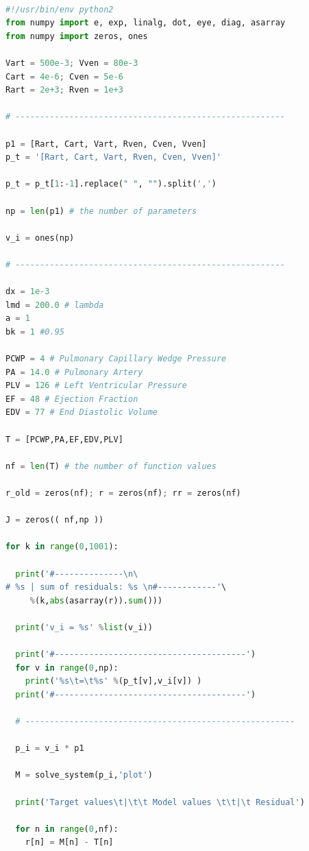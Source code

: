 
\begin{lstlisting}[language=Python,caption={Процедура оптимизации на основе алгоритма Левенберга-Марквардта на языке программирования Python},label={list:optimization_routine}]

#!/usr/bin/env python2
from numpy import e, exp, linalg, dot, eye, diag, asarray
from numpy import zeros, ones

Vart = 500e-3; Vven = 80e-3
Cart = 4e-6; Cven = 5e-6
Rart = 2e+3; Rven = 1e+3

# -------------------------------------------------------

p1 = [Rart, Cart, Vart, Rven, Cven, Vven]
p_t = '[Rart, Cart, Vart, Rven, Cven, Vven]'

p_t = p_t[1:-1].replace(" ", "").split(',')

np = len(p1) # the number of parameters

v_i = ones(np)

# -------------------------------------------------------

dx = 1e-3
lmd = 200.0 # lambda
a = 1
bk = 1 #0.95

PCWP = 4 # Pulmonary Capillary Wedge Pressure
PA = 14.0 # Pulmonary Artery
PLV = 126 # Left Ventricular Pressure 
EF = 48 # Ejection Fraction
EDV = 77 # End Diastolic Volume

T = [PCWP,PA,EF,EDV,PLV]

nf = len(T) # the number of function values

r_old = zeros(nf); r = zeros(nf); rr = zeros(nf)

J = zeros(( nf,np ))

for k in range(0,1001):

  print('#--------------\n\
# %s | sum of residuals: %s \n#------------'\
     %(k,abs(asarray(r)).sum())) 

  print('v_i = %s' %list(v_i)) 

  print('#---------------------------------------')
  for v in range(0,np):
    print('%s\t=\t%s' %(p_t[v],v_i[v]) )
  print('#---------------------------------------')

  # -------------------------------------------------------

  p_i = v_i * p1

  M = solve_system(p_i,'plot')

  print('Target values\t|\t\t Model values \t\t|\t Residual') 

  for n in range(0,nf):
    r[n] = M[n] - T[n]


\end{lstlisting}
